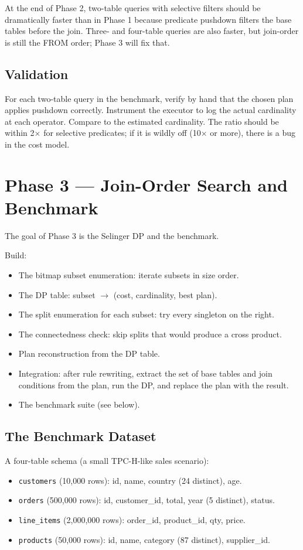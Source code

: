 \documentclass[11pt,a4paper]{article}
\begin{document}
At the end of Phase 2, two-table queries with selective filters should be dramatically faster than in Phase 1 because predicate pushdown filters the base tables before the join. Three- and four-table queries are also faster, but join-order is still the FROM order; Phase 3 will fix that.

\subsection{Validation}
For each two-table query in the benchmark, verify by hand that the chosen plan applies pushdown correctly. Instrument the executor to log the actual cardinality at each operator. Compare to the estimated cardinality. The ratio should be within 2$\times$ for selective predicates; if it is wildly off (10$\times$ or more), there is a bug in the cost model.

\section{Phase 3 --- Join-Order Search and Benchmark}

The goal of Phase 3 is the Selinger DP and the benchmark.

Build:
\begin{itemize}
\item The bitmap subset enumeration: iterate subsets in size order.
\item The DP table: subset $\to$ (cost, cardinality, best plan).
\item The split enumeration for each subset: try every singleton on the right.
\item The connectedness check: skip splits that would produce a cross product.
\item Plan reconstruction from the DP table.
\item Integration: after rule rewriting, extract the set of base tables and join conditions from the plan, run the DP, and replace the plan with the result.
\item The benchmark suite (see below).
\end{itemize}

\subsection{The Benchmark Dataset}
A four-table schema (a small TPC-H-like sales scenario):

\begin{itemize}
\item \texttt{customers} (10{,}000 rows): id, name, country (24 distinct), age.
\item \texttt{orders} (500{,}000 rows): id, customer\_id, total, year (5 distinct), status.
\item \texttt{line\_items} (2{,}000{,}000 rows): order\_id, product\_id, qty, price.
\item \texttt{products} (50{,}000 rows): id, name, category (87 distinct), supplier\_id.
\end{itemize}
\end{document}
